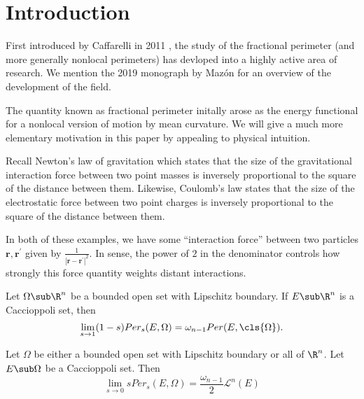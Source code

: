 \documentclass[../main.tex]{subfiles}
\begin{document}
\section{Introduction}

First introduced by Caffarelli in 2011 \cite{caffarelli:nonlocal, caffarelli:limit}, the study of the fractional perimeter (and more generally nonlocal perimeters) has devloped into a highly active area of research. We mention the 2019 monograph by Maz\'on \cite{mazon:nonlocal} for an overview of the development of the field. 

The quantity known as fractional perimeter initally arose as the energy functional for a nonlocal version of motion by mean curvature. We will give a much more elementary motivation in this paper by appealing to physical intuition.

Recall Newton's law of gravitation which states that the size of the gravitational interaction force between two point masses is inversely proportional to the square of the distance between them. Likewise, Coulomb's law states that the size of the electrostatic force between two point charges is inversely proportional to the square of the distance between them.

In both of these examples, we have some ``interaction force'' between two particles $ \mathbf{r},\mathbf{r^{\prime}} $ given by $ \frac{1}{|\mathbf{r}-\mathbf{r^{\prime}}|^{2}} $. In sense, the power of $ 2 $ in the denominator controls how strongly this force quantity weights distant interactions.


\begin{maintheorem}\label{sto1}
    Let $ \Omega\sub \R^{n} $ be a bounded open set with Lipschitz boundary. If $ E\sub \R^{n} $ is a Caccioppoli set, then
    \begin{equation}
        \lim_{s\to1}(1-s) Per_{s}(E, \Omega) = \omega_{n-1} Per(E,\cls{\Omega}).
    \end{equation}
\end{maintheorem}


\begin{maintheorem}\label{sto0}
    Let $ \Omega $ be either a bounded open set with Lipschitz boundary or all of $ \R^{n} $. Let $ E\sub \Omega $ be a Caccioppoli set. Then 
    \begin{equation}
        \lim_{s\to0} sPer_{s}(E,\Omega) = \frac{\omega_{n-1}}{2} \mathcal{L}^{n}(E)
    \end{equation}
\end{maintheorem}
\end{document}
